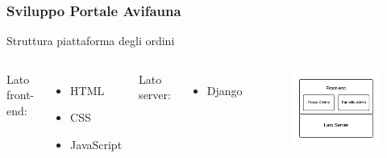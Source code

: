 \documentclass{beamer}
\def \sv {Sviluppo Portale Avifauna}
\def \js {JavaScript}
\begin{document}
\begin{frame}
 \frametitle{\sv}
 \begin{center}
  Struttura piattaforma degli ordini
  \begin{columns}
    Lato front-end:
     \begin{itemize}
      \item HTML
      \item CSS
      \item {\js}
     \end{itemize}
    Lato server:
     \begin{itemize}
      \item Django
     \end{itemize}
   \begin{figure}
     \includegraphics[scale=0.75]{images/struttura-piattaforma}
   \end{figure}
  \end{columns}
 \end{center}
\end{frame}
\end{document}
